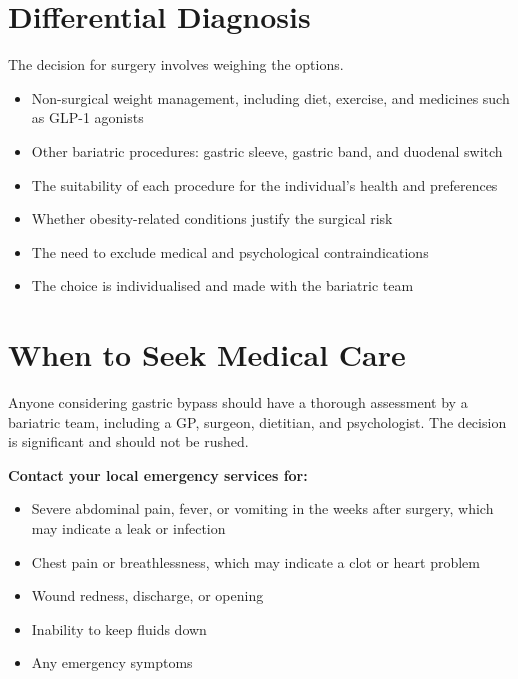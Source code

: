 \section*{Differential Diagnosis}
The decision for surgery involves weighing the options.
\begin{itemize}
    \item Non-surgical weight management, including diet, exercise, and medicines such as GLP-1 agonists
    \item Other bariatric procedures: gastric sleeve, gastric band, and duodenal switch
    \item The suitability of each procedure for the individual's health and preferences
    \item Whether obesity-related conditions justify the surgical risk
    \item The need to exclude medical and psychological contraindications
    \item The choice is individualised and made with the bariatric team
\end{itemize}

\section*{When to Seek Medical Care}
Anyone considering gastric bypass should have a thorough assessment by a bariatric team, including a GP, surgeon, dietitian, and psychologist. The decision is significant and should not be rushed.

\textbf{Contact your local emergency services for:}
\begin{itemize}
    \item Severe abdominal pain, fever, or vomiting in the weeks after surgery, which may indicate a leak or infection
    \item Chest pain or breathlessness, which may indicate a clot or heart problem
    \item Wound redness, discharge, or opening
    \item Inability to keep fluids down
    \item Any emergency symptoms
\end{itemize}

